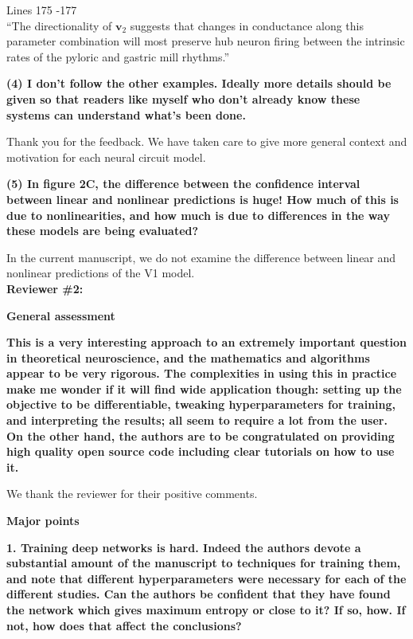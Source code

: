 \documentclass[11pt,a4paper]{article}
\begin{document}
\begin{displayquote}
Lines 175 -177 \\
``The directionality of $\mathbf{v}_2$ suggests that changes in conductance along this parameter combination will most preserve hub neuron firing between the intrinsic rates of the pyloric and gastric mill rhythms.''
\end{displayquote}
 
\textbf{(4) I don't follow the other examples. Ideally more details should be given so that readers like myself who don't already know these systems can understand what's been done. }

Thank you for the feedback.  We have taken care to give more general context and motivation for each neural circuit model.

\textbf{(5) In figure 2C, the difference between the confidence interval between linear and nonlinear predictions is huge! How much of this is due to nonlinearities, and how much is due to differences in the way these models are being evaluated? }

In the current manuscript, we do not examine the difference between linear and nonlinear predictions of the V1 model. \\

{\Large \textbf{Reviewer \#2: }}

\textbf{General assessment }

\textbf{This is a very interesting approach to an extremely important question in theoretical neuroscience, and the mathematics and algorithms appear to be very rigorous. The complexities in using this in practice make me wonder if it will find wide application though: setting up the objective to be differentiable, tweaking hyperparameters for training, and interpreting the results; all seem to require a lot from the user. On the other hand, the authors are to be congratulated on providing high quality open source code including clear tutorials on how to use it. }

We thank the reviewer for their positive comments.  

\textbf{Major points }

\textbf{1. Training deep networks is hard. Indeed the authors devote a substantial amount of the manuscript to techniques for training them, and note that different hyperparameters were necessary for each of the different studies. Can the authors be confident that they have found the network which gives maximum entropy or close to it? If so, how. If not, how does that affect the conclusions? }
\end{document}
